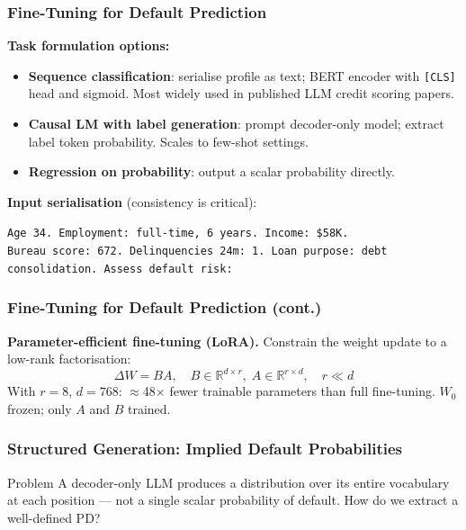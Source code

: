 \documentclass[9pt,t]{beamer}
\begin{document}
\begin{frame}
\frametitle{Fine-Tuning for Default Prediction}

\textbf{Task formulation options:}
\begin{itemize}
  \item \textbf{Sequence classification}: serialise profile as text; BERT encoder with \texttt{[CLS]} head and sigmoid. Most widely used in published LLM credit scoring papers.
  \item \textbf{Causal LM with label generation}: prompt decoder-only model; extract label token probability. Scales to few-shot settings.
  \item \textbf{Regression on probability}: output a scalar probability directly.
\end{itemize}

\medskip
\textbf{Input serialisation} (consistency is critical):
\begin{center}
\small
\texttt{Age 34. Employment: full-time, 6 years. Income: \$58K.}\\
\texttt{Bureau score: 672. Delinquencies 24m: 1. Loan purpose: debt consolidation. Assess default risk:}
\end{center}
\end{frame}

\begin{frame}
\frametitle{Fine-Tuning for Default Prediction (cont.)}

\begin{underhood}
  \textbf{Parameter-efficient fine-tuning (LoRA).} Constrain the weight update to a
  low-rank factorisation:
  \[
    \Delta W = B A, \quad B \in \mathbb{R}^{d \times r}, \; A \in \mathbb{R}^{r \times d}, \quad r \ll d
  \]
  With $r = 8$, $d = 768$: $\approx$48$\times$ fewer trainable parameters than full
  fine-tuning. $W_0$ frozen; only $A$ and $B$ trained.
\end{underhood}
\end{frame}

\begin{frame}
\frametitle{Structured Generation: Implied Default Probabilities}

\begin{block}{Problem}
  A decoder-only LLM produces a distribution over its entire vocabulary at each position ---
  not a single scalar probability of default. How do we extract a well-defined PD?
\end{block}
\end{frame}
\end{document}
